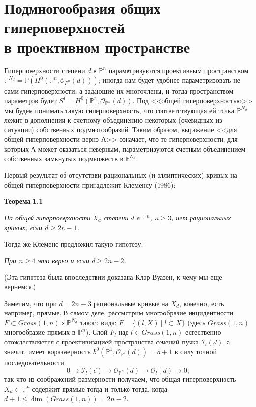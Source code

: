 \section{Подмногообразия общих гиперповерхностей\\ в проективном пространстве}

Гиперповерхности степени $d$ в $\mathbb{P}^n$ параметризуются проективным пространством
$\mathbb{P}^{N_d}=\mathbb{P}(H^0(\mathbb{P}^n, \mathcal{O}_{P^n}(d)))$; иногда нам будет удобнее параметризовать
не сами гиперповерхности, а задающие их многочлены, и тогда пространством
параметров будет $S^d=H^0(\mathbb{P}^n, \mathcal{O}_{\mathbb{P}^n}(d))$. Под <<общей гиперповерхностью>>
мы будем понимать такую гиперповерхность, что соответствующая ей точка $\mathbb{P}^{N_d}$ лежит
в дополнении к счетному объединению некоторых (очевидных из ситуации) собственных подмногообразий. Таким
образом, выражение <<для общей гиперповерхности верно А>> означает, что те гиперповерхности, для которых А
может оказаться неверным, параметризуются счетным объединением собственных замкнутых подмножеств в $\mathbb{P}^{N_d}$.

Первый результат об отсутствии рациональных (и эллиптических) кривых на общей гиперповерхности принадлежит Клеменсу (1986):


{\bf Теорема 1.1}
	\begin{theorem}
		{\it
			На общей гиперповерхности $X_d$ степени $d$ в $\mathbb{P}^n$, $n\geq 3$, нет рациональных кривых, если $d\geq 2n-1$.
		}
	\end{theorem}


Тогда же Клеменс предложил такую гипотезу:

\medskip

\textit{При $n\geq 4$ это верно и если $d\geq 2n-2$.}

\medskip
(Эта гипотеза была впоследствии доказана Клэр Вуазен, к чему мы еще вернемся.)

Заметим, что при $d= 2n-3$ рациональные кривые на $X_d$, конечно, есть например, прямые.
В самом деле, рассмотрим многообразие инцидентности $F\subset Grass(1,n)\times \mathbb{P}^{N_d}$ 
такого вида: $F=\{(l,X)\mid l\subset X\}$ (здесь $Grass(1,n)$ многообразие прямых в $\mathbb{P}^n$).
Слой $F_l$ над $l\in Grass(1,n)$ естественно отождествляется с проективизацией
пространства сечений пучка $\mathcal{I}_l(d)$, а значит, имеет коразмерность
\linebreak 
$h^0(\mathbb{P}^1,\mathcal{O}_{\mathbb{P}^1}(d))= d+1$ в силу точной последовательности
$$
0\rightarrow \mathcal{I}_l(d)\rightarrow \mathcal{O}_{\mathbb{P}^n}(d)\rightarrow
\mathcal{O}_{l}(d)\rightarrow 0;
$$
так что из соображений размерности получаем, что общая гиперповерхность
$X_d\subset \mathbb{P}^n$ содержит прямые тогда и только тогда, когда $d+1\leq \dim(Grass(1,n))=2n-2$.

